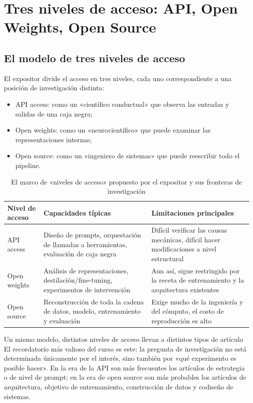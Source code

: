 \section{Tres niveles de acceso: API, Open Weights, Open Source}

\subsection{El modelo de tres niveles de acceso}
El expositor divide el acceso en tres niveles, cada uno correspondiente a una posición de investigación distinta:
\begin{itemize}
    \item API access: como un «científico conductual» que observa las entradas y salidas de una caja negra;
    \item Open weights: como un «neurocientífico» que puede examinar las representaciones internas;
    \item Open source: como un «ingeniero de sistemas» que puede reescribir todo el pipeline.
\end{itemize}

\begin{table}[H]
\centering
\begin{tabular}{p{2.4cm}p{4.2cm}p{4.8cm}}
\toprule
\textbf{Nivel de acceso} & \textbf{Capacidades típicas} & \textbf{Limitaciones principales} \\
\midrule
API access & Diseño de prompts, orquestación de llamadas a herramientas, evaluación de caja negra & Difícil verificar las causas mecánicas, difícil hacer modificaciones a nivel estructural \\
Open weights & Análisis de representaciones, destilación/fine-tuning, experimentos de intervención & Aun así, sigue restringido por la receta de entrenamiento y la arquitectura existentes \\
Open source & Reconstrucción de toda la cadena de datos, modelo, entrenamiento y evaluación & Exige mucho de la ingeniería y del cómputo, el costo de reproducción es alto \\
\bottomrule
\end{tabular}
\caption{El marco de «niveles de acceso» propuesto por el expositor y sus fronteras de investigación}
\end{table}

\begin{importantbox}{Un mismo modelo, distintos niveles de acceso llevan a distintos tipos de artículo}
El recordatorio más valioso del curso es este: la pregunta de investigación no está determinada únicamente por el interés, sino también por «qué experimento es posible hacer».
En la era de la API son más frecuentes los artículos de estrategia o de nivel de prompt; en la era de open source son más probables los artículos de arquitectura, objetivo de entrenamiento, construcción de datos y codiseño de sistemas.
\end{importantbox}

